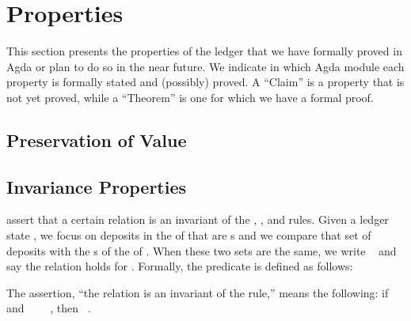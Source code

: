 \documentclass[11pt,a4paper,dvipsnames]{article}
\begin{document}
\tableofcontents



\section{Properties}
This section presents the properties of the ledger that we have formally proved in
Agda or plan to do so in the near future.  We indicate in which Agda module each
property is formally stated and (possibly) proved. A ``Claim'' is a property that is
not yet proved, while a ``Theorem'' is one for which we have a formal proof.

\subsection{Preservation of Value}

\subsection{Invariance Properties}

 assert that
a certain relation is an invariant of the \LEDGER{}, \EPOCH{}, and \CHAIN{} rules.
Given a ledger state , we focus on deposits in the
\UTxOState{} of  that are \GovActionDeposit{}s and we compare that set of
deposits with the \GovActionDeposit{}s of the \GovState{} of .
When these two sets are the same, we write ~ and say
the  relation holds for .
Formally, the  predicate is defined as follows:


The assertion, 
``the  relation is an invariant of the \LEDGER{} rule,''
means the following:  if \govDepsMatch{}~ and
~~~~, then
\govDepsMatch{}~.
\end{document}
